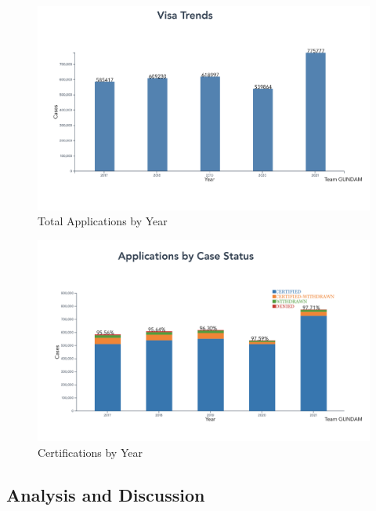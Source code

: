 \documentclass[sigconf]{acmart}
\begin{document}
\begin{figure}
  \includegraphics[width=\linewidth]{visa_trend.png}
  \caption{Total Applications by Year}
  \label{fig:appsbyyear}
\end{figure}

\begin{figure}
  \includegraphics[width=\linewidth]{case_status_rate.png}
  \caption{Certifications by Year}
  \label{fig:casestatusrate}
\end{figure}



\subsection{Analysis and Discussion}

\end{document}
